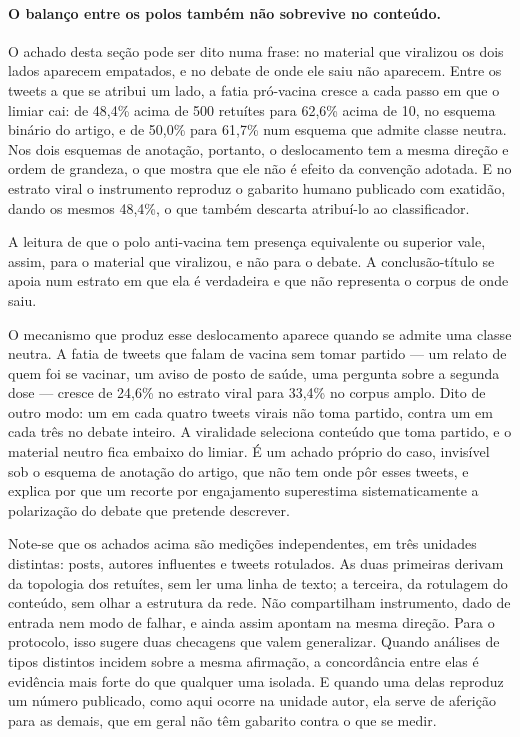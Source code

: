 \paragraph{O balanço entre os polos também não sobrevive no conteúdo.} O achado
desta seção pode ser dito numa frase: no material que viralizou os dois lados
aparecem empatados, e no debate de onde ele saiu não aparecem. Entre os tweets a
que se atribui um lado, a fatia pró-vacina cresce a cada passo em que o limiar cai:
de 48,4\% acima de 500 retuítes para 62,6\% acima de 10, no esquema binário do
artigo, e de 50,0\% para 61,7\% num esquema que admite classe neutra. Nos dois
esquemas de anotação, portanto, o deslocamento tem a mesma direção e ordem de
grandeza, o que mostra que ele não é efeito da convenção adotada. E no estrato
viral o instrumento reproduz o gabarito humano publicado com exatidão, dando os
mesmos 48,4\%, o que também descarta atribuí-lo ao classificador.

A leitura de que o polo anti-vacina tem presença equivalente ou superior vale,
assim, para o material que viralizou, e não para o debate. A conclusão-título se
apoia num estrato em que ela é verdadeira e que não representa o corpus de onde
saiu.

O mecanismo que produz esse deslocamento aparece quando se admite uma classe
neutra. A fatia de tweets que falam de vacina sem tomar partido — um relato de
quem foi se vacinar, um aviso de posto de saúde, uma pergunta sobre a segunda dose
— cresce de 24,6\% no estrato viral para 33,4\% no corpus amplo. Dito de outro
modo: um em cada quatro tweets virais não toma partido, contra um em cada três no
debate inteiro. A viralidade seleciona conteúdo que toma partido, e o material
neutro fica embaixo do limiar. É um achado próprio do caso, invisível sob o esquema
de anotação do artigo, que não tem onde pôr esses tweets, e explica por que um
recorte por engajamento superestima sistematicamente a polarização do debate que
pretende descrever.

Note-se que os achados acima são medições independentes, em três unidades
distintas: posts, autores influentes e tweets rotulados. As duas primeiras derivam da
topologia dos retuítes, sem ler uma linha de texto; a terceira, da rotulagem do
conteúdo, sem olhar a estrutura da rede. Não compartilham instrumento, dado de
entrada nem modo de falhar, e ainda assim apontam na mesma direção. Para o protocolo,
isso sugere duas checagens que valem generalizar. Quando análises de tipos distintos
incidem sobre a mesma afirmação, a concordância entre elas é evidência mais forte do
que qualquer uma isolada. E quando uma delas reproduz um número publicado, como aqui
ocorre na unidade autor, ela serve de aferição para as demais, que em geral não têm
gabarito contra o que se medir.

